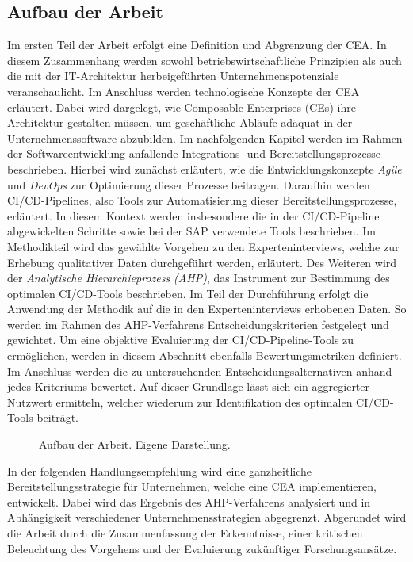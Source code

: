\subsection{Aufbau der Arbeit}
Im ersten Teil der Arbeit erfolgt eine Definition und Abgrenzung der CEA. In diesem Zusammenhang werden sowohl betriebswirtschaftliche Prinzipien als auch die mit der IT-Architektur herbeigeführten Unternehmenspotenziale veranschaulicht. Im Anschluss werden technologische Konzepte der CEA erläutert. Dabei wird dargelegt, wie Composable-Enterprises (\acs{CE}s) ihre Architektur gestalten müssen, um geschäftliche Abläufe adäquat in der Unternehmenssoftware abzubilden. Im nachfolgenden Kapitel werden im Rahmen der Softwareentwicklung anfallende Integrations- und Bereitstellungsprozesse beschrieben. Hierbei wird zunächst erläutert, wie die Entwicklungskonzepte \textit{Agile} und \textit{DevOps} zur Optimierung dieser Prozesse beitragen. Daraufhin werden CI/CD-Pipelines, also Tools zur Automatisierung dieser Bereitstellungsprozesse, erläutert. In diesem Kontext werden insbesondere die in der CI/CD-Pipeline abgewickelten Schritte sowie bei der SAP verwendete Tools beschrieben. Im Methodikteil wird das gewählte Vorgehen zu den Experteninterviews, welche zur Erhebung qualitativer Daten durchgeführt werden, erläutert. Des Weiteren wird der \textit{Analytische Hierarchieprozess (\acs{AHP})}, das Instrument zur Bestimmung des optimalen CI/CD-Tools beschrieben. Im Teil der Durchführung erfolgt die Anwendung der Methodik auf die in den Experteninterviews erhobenen Daten. So werden im Rahmen des AHP-Verfahrens Entscheidungskriterien festgelegt und gewichtet. Um eine objektive Evaluierung der CI/CD-Pipeline-Tools zu ermöglichen, werden in diesem Abschnitt ebenfalls Bewertungsmetriken definiert. Im Anschluss werden die zu untersuchenden Entscheidungsalternativen anhand jedes Kriteriums bewertet. Auf dieser Grundlage lässt sich ein aggregierter Nutzwert ermitteln, welcher wiederum zur Identifikation des optimalen CI/CD-Tools beiträgt. 
\begin{center}
	\begin{figure}[H]
		\centering
		\caption[Aufbau der Arbeit]{Aufbau der Arbeit. Eigene Darstellung.}
		\label{fig:Aufbau}
	\end{figure}	
\end{center}
\vspace*{-15mm}
In der folgenden Handlungsempfehlung wird eine ganzheitliche Bereitstellungsstrategie für Unternehmen, welche eine CEA implementieren, entwickelt. Dabei wird das Ergebnis des AHP-Verfahrens analysiert und in Abhängigkeit verschiedener Unternehmensstrategien abgegrenzt. Abgerundet wird die Arbeit durch die Zusammenfassung der Erkenntnisse, einer kritischen Beleuchtung des Vorgehens und der Evaluierung zukünftiger Forschungsansätze. 

